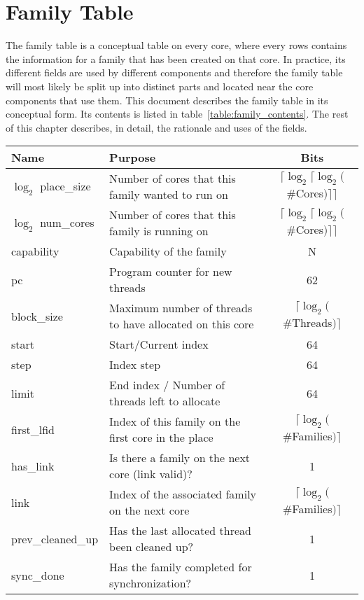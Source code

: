\chapter{Family Table}

The family table is a conceptual table on every core, where every rows contains the information for a family that has been created on that core. In practice, its different fields are used by different components and therefore the family table will most likely be split up into distinct parts and located near the core components that use them. This document describes the family table in its conceptual form. Its contents is listed in table~\ref{table:family_contents}. The rest of this chapter describes, in detail, the rationale and uses of the fields.

\begin{table}
\begin{center}
\begin{tabularx}{\textwidth}{|l|X|c|}
\hline
Name & Purpose & Bits\\
\hline
\hline
$\log_2$ place\_size & Number of cores that this family wanted to run on & $\lceil \log_2 \lceil \log_2($\#Cores$)\rceil \rceil$ \\
$\log_2$ num\_cores & Number of cores that this family is running on & $\lceil \log_2 \lceil \log_2($\#Cores$)\rceil \rceil$ \\
capability & Capability of the family & N \\
pc & Program counter for new threads & 62 \\
block\_size & Maximum number of threads to have allocated on this core & $\lceil \log_2($\#Threads$)\rceil$ \\
start & Start/Current index & 64 \\
step & Index step & 64 \\
limit & End index / Number of threads left to allocate & 64 \\
first\_lfid & Index of this family on the first core in the place & $\lceil \log_2($\#Families$)\rceil$ \\
has\_link & Is there a family on the next core (link valid)? & 1 \\
link & Index of the associated family on the next core & $\lceil \log_2($\#Families$)\rceil$ \\
prev\_cleaned\_up & Has the last allocated thread been cleaned up? & 1 \\
sync\_done & Has the family completed for synchronization? & 1 \\

\end{tabularx}
\end{center}
\end{table}
